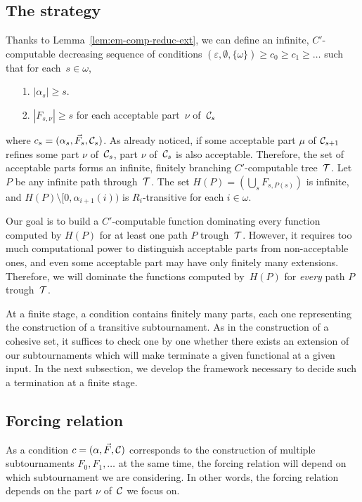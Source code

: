 \subsection{The strategy}

Thanks to Lemma~\ref{lem:em-comp-reduc-ext}, we can define an infinite, $C'$-computable
decreasing sequence of conditions $(\varepsilon, \emptyset, \{\omega\}) \geq c_0 \geq c_1 \geq \dots$
such that for each~$s \in \omega$, 
\begin{itemize}
	\item[1.] $|\alpha_s| \geq s$.
	\item[2.] $|F_{s, \nu}| \geq s$ for each acceptable part~$\nu$ of~$\mathcal{C}_s$
\end{itemize}
where $c_s = (\alpha_s, \vec{F}_s, \mathcal{C}_s)$.
As already noticed, if some acceptable part $\mu$ of $\mathcal{C}_{s+1}$ refines some part $\nu$ of~$\mathcal{C}_s$,
part $\nu$ of~$\mathcal{C}_s$ is also acceptable.
Therefore, the set of acceptable parts forms an infinite, finitely branching $C'$-computable tree~$\mathcal{T}$.
Let $P$ be any infinite path through~$\mathcal{T}$. 
The set $H(P) = (\bigcup_s F_{s, P(s)})$ is infinite,
and $H(P) \setminus [0, \alpha_{i+1}(i))$ is $R_i$-transitive for each $i \in \omega$.

Our goal is to build a $C'$-computable function dominating every function computed
by $H(P)$ for at least one path $P$ trough~$\mathcal{T}$. However, it requires too much
computational power to distinguish acceptable parts from non-acceptable ones,
and even some acceptable part may have only finitely many extensions. Therefore,
we will dominate the functions computed by~$H(P)$ for \emph{every} path $P$ trough~$\mathcal{T}$.
 
At a finite stage, a condition contains finitely many parts, each one representing
the construction of a transitive subtournament.
As in the construction of a cohesive set, it suffices to check one by one whether 
there exists an extension of our subtournaments which will
make terminate a given functional at a given input.
In the next subsection, we develop the framework necessary to decide such a termination
at a finite stage.

\subsection{Forcing relation}

As a condition $c = (\alpha, \vec{F}, \mathcal{C})$ corresponds to the construction of multiple
subtournaments $F_0, F_1, \dots$ at the same time, the forcing relation will depend on which
subtournament we are considering. In other words, the forcing relation depends on the part $\nu$ of~$\mathcal{C}$
we focus on.

